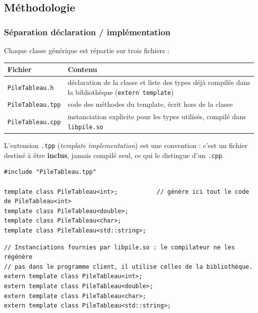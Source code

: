 \documentclass[11pt,a4paper]{article}
\newcommand{\code}[1]{\texttt{#1}}
\begin{document}
\subsection{Méthodologie}

\subsubsection{Séparation déclaration / implémentation}

Chaque classe générique est répartie sur trois fichiers :
\begin{center}
\small
\begin{tabularx}{\linewidth}{l X}
  \toprule
  \textbf{Fichier} & \textbf{Contenu} \\
  \midrule
  \code{PileTableau.h}   & déclaration de la classe et liste des types déjà
                           compilés dans la bibliothèque (\code{extern template}) \\
  \code{PileTableau.tpp} & code des méthodes du template, écrit hors de la classe \\
  \code{PileTableau.cpp} & instanciation explicite pour les types utilisés,
                           compilé dans \code{libpile.so} \\
  \bottomrule
\end{tabularx}
\end{center}

L'extension \code{.tpp} (\emph{template implementation}) est une
convention : c'est un fichier destiné à être \textbf{inclus}, jamais
compilé seul, ce qui le distingue d'un \code{.cpp}.

\begin{lstlisting}[caption={Instanciation explicite (\code{src/PileTableau.cpp}, compilé dans la bibliothèque)}]
#include "PileTableau.tpp"

template class PileTableau<int>;           // génère ici tout le code de PileTableau<int>
template class PileTableau<double>;
template class PileTableau<char>;
template class PileTableau<std::string>;
\end{lstlisting}

\begin{lstlisting}[caption={Déclaration vue par les programmes clients (fin de \code{include/PileTableau.h})}]
// Instanciations fournies par libpile.so : le compilateur ne les régénère
// pas dans le programme client, il utilise celles de la bibliothèque.
extern template class PileTableau<int>;
extern template class PileTableau<double>;
extern template class PileTableau<char>;
extern template class PileTableau<std::string>;
\end{lstlisting}
\end{document}

